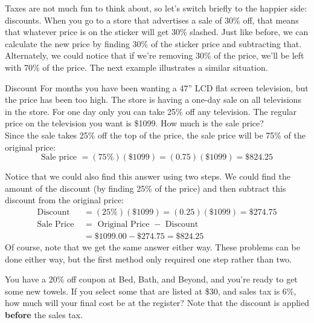 Taxes are not much fun to think about, so let's switch briefly to the happier side: discounts.  When you go to a store that advertises a sale of 30\% off, that means that whatever price is on the sticker will get 30\% slashed.  Just like before, we can calculate the new price by finding 30\% of the sticker price and subtracting that.  Alternately, we could notice that if we're removing 30\% of the price, we'll be left with 70\% of the price.  The next example illustrates a similar situation.

\begin{example}[https://www.youtube.com/watch?v=eKcXhopfVrU]{Discount}
\marginnote{\texttt{[image: TV1]}}
For months you have been wanting a 47'' LCD flat screen television, but the price has been too high. The store is having a one-day sale on all televisions in the store. For one day only you can take 25\% off any television. The regular price on the television
you want is \$1099.  How much is the sale price?\\

Since the sale takes 25\% off the top of the price, the sale price will be 75\% of the original price:
\[\textrm{Sale price } = (75\%)(\$1099) = (0.75)(\$1099) = \$824.25\]

Notice that we could also find this answer using two steps.  We could find the amount of the discount (by finding 25\% of the price) and then subtract this discount from the original price:
\begin{align*}
\textrm{Discount } &= (25\%)(\$1099) = (0.25)(\$1099) = \$274.75\\
\textrm{Sale Price } &= \textrm{ Original Price } - \textrm{ Discount}\\
&= \$1099.00 - \$274.75 = \$824.25
\end{align*}
Of course, note that we get the same answer either way.  These problems can be done either way, but the first method only required one step rather than two.
\end{example}

\begin{try}
You have a 20\% off coupon at Bed, Bath, and Beyond, and you're ready to get some new towels.  If you select some that are listed at \$30, and sales tax is 6\%, how much will your final cost be at the register?  Note that the discount is applied \textbf{before} the sales tax.
\end{try}

